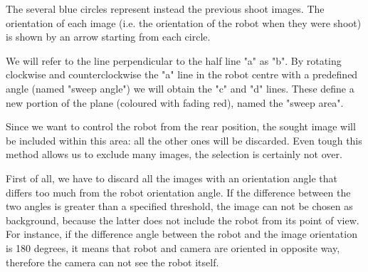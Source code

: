 %
The several blue circles represent instead the previous shoot images. The orientation of each
image (i.e. the orientation of the robot when they were shoot) is shown by an arrow starting from
each circle.
%

%
We will refer to the line perpendicular to the half line "a" as "b". By rotating clockwise and
counterclockwise the "a" line in the robot centre with a predefined angle (named "sweep angle")
we will obtain the "c" and "d" lines. These define a new portion of the plane (coloured with fading red),
named the "sweep area".
%

%
Since we want to control the robot from the rear position, the sought image will be included within
this area: all the other ones will be discarded. Even tough this method allows us to exclude many
images, the selection is certainly not over.
%

%
First of all, we have to discard all the images with an orientation angle that differs too much from the
robot orientation angle. If the difference between the two angles is greater than a specified threshold,
the image can not be chosen as background, because the latter does not include the robot from its point
of view. For instance, if the difference angle between the robot and the image orientation is 180 degrees,
it means that robot and camera are oriented in opposite way, therefore the camera can not see the robot
itself.
%

